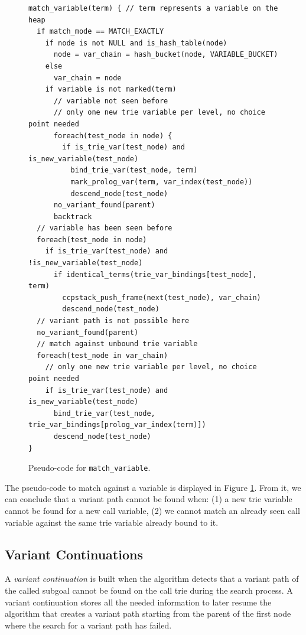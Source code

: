 \begin{figure}[ht]
\begin{Verbatim}
match_variable(term) { // term represents a variable on the heap
  if match_mode == MATCH_EXACTLY
    if node is not NULL and is_hash_table(node)
      node = var_chain = hash_bucket(node, VARIABLE_BUCKET)
    else
      var_chain = node
    if variable is not marked(term)
      // variable not seen before
      // only one new trie variable per level, no choice point needed
      foreach(test_node in node) {
        if is_trie_var(test_node) and is_new_variable(test_node)
          bind_trie_var(test_node, term)
          mark_prolog_var(term, var_index(test_node))
          descend_node(test_node)
      no_variant_found(parent)
      backtrack
  // variable has been seen before
  foreach(test_node in node)
    if is_trie_var(test_node) and !is_new_variable(test_node)
      if identical_terms(trie_var_bindings[test_node], term)
        ccpstack_push_frame(next(test_node), var_chain)
        descend_node(test_node)
  // variant path is not possible here
  no_variant_found(parent)
  // match against unbound trie variable
  foreach(test_node in var_chain)
    // only one new trie variable per level, no choice point needed
    if is_trie_var(test_node) and is_new_variable(test_node)
      bind_trie_var(test_node, trie_var_bindings[prolog_var_index(term)])
      descend_node(test_node)
}
\end{Verbatim}
\caption{Pseudo-code for \texttt{match\_variable}.}
\label{fig:match_variable}
\end{figure}

The pseudo-code to match against a variable is displayed in Figure
\ref{fig:match_variable}. From it, we can conclude that a variant path
cannot be found when: (1) a new trie variable cannot be found
for a new call variable, (2) we cannot match an already seen
call variable against the same trie variable already bound to it.

\subsection{Variant Continuations}

A \textit{variant continuation} is built when the algorithm detects that a variant path of the
called subgoal cannot be found on the call trie during the search process.
A variant continuation stores all the needed information to later resume
the algorithm that creates a variant path starting from the parent of the first node where the
search for a variant path has failed.

